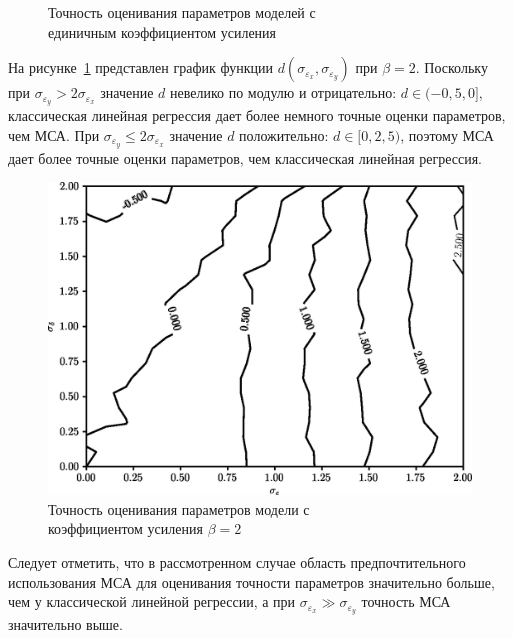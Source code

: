 \begin{figure}[p]
  \vspace{\baselineskip}
  \caption{%
    Точность оценивания параметров моделей с \\
    единичным коэффициентом усиления
  }
\end{figure}

\newpage
На рисунке~\ref{fig:comparison_linear_params_beta-2}
представлен график функции \( d(\sigma_{\varepsilon_x}, \sigma_{\varepsilon_y}) \)
при \( \beta = 2 \).
Поскольку при \( \sigma_{\varepsilon_y} > 2 \sigma_{\varepsilon_x} \)
значение \( d \) невелико по модулю и отрицательно: \( d \in ( -0{,}5, 0 ] \),
классическая линейная регрессия дает более немного точные оценки параметров, чем МСА.
При \( \sigma_{\varepsilon_y} \le 2\sigma_{\varepsilon_x} \)
значение \( d \) положительно: \( d \in [0, 2{,}5 ) \),
поэтому МСА дает более точные оценки параметров,
чем классическая линейная регрессия.

\begin{figure}[h]
  \centering
  \includegraphics[width=135mm]{fig/linear/param/beta-2_param.png}
  \caption{%
    Точность оценивания параметров модели с \\
    коэффициентом усиления \( \beta = 2 \)
  }\label{fig:comparison_linear_params_beta-2}
\end{figure}

Следует отметить, что в рассмотренном случае область предпочтительного использования
МСА для оценивания точности параметров значительно больше,
чем у классической линейной регрессии,
а при \( \sigma_{\varepsilon_x} \gg \sigma_{\varepsilon_y} \) точность МСА значительно выше.

